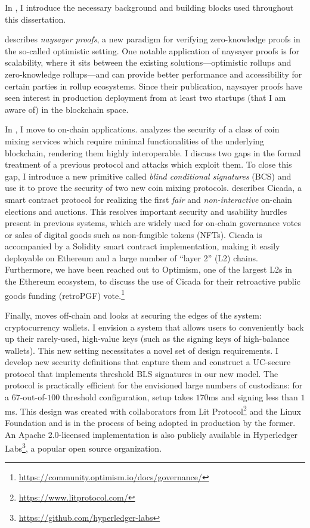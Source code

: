 In , I introduce the necessary background and building blocks used throughout this dissertation. 

 describes \emph{naysayer proofs}, a new paradigm for verifying zero-knowledge proofs in the so-called optimistic setting. One notable application of naysayer proofs is for scalability, where it sits between the existing solutions---optimistic rollups and zero-knowledge rollups---and can provide better performance and accessibility for certain parties in rollup ecosystems. Since their publication, naysayer proofs have seen interest in production deployment from at least two startups (that I am aware of) in the blockchain space. %

In , I move to on-chain applications. 
 analyzes the security of a class of coin mixing services which require minimal functionalities of the underlying blockchain, rendering them highly interoperable. I discuss two gaps in the formal treatment of a previous protocol and attacks which exploit them. To close this gap, I introduce a new primitive called \emph{blind conditional signatures} (BCS) and use it to prove the security of two new coin mixing protocols.
 describes Cicada, a smart contract protocol for realizing the first \emph{fair} and \emph{non-interactive} on-chain elections and auctions. This resolves important security and usability hurdles present in previous systems, which are widely used for on-chain governance votes or sales of digital goods such as non-fungible tokens (NFTs). Cicada is accompanied by a Solidity smart contract implementation, making it easily deployable on Ethereum and a large number of ``layer 2'' (L2) chains. Furthermore, we have been reached out to Optimism, one of the largest L2s in the Ethereum ecosystem, to discuss the use of Cicada for their retroactive public goods funding (retroPGF) vote.\footnote{\url{https://community.optimism.io/docs/governance/}}

Finally,  moves off-chain and looks at securing the edges of the system: cryptocurrency wallets. I envision a system that allows users to conveniently back up their rarely-used, high-value keys (such as the signing keys of high-balance wallets). This new setting necessitates a novel set of design requirements. I develop new security definitions that capture them and construct a UC-secure protocol that implements threshold BLS signatures in our new model. The protocol is practically efficient for the envisioned large numbers of custodians: for a $67$-out-of-$100$ threshold configuration, setup takes $170$ms and signing less than $1$ms.
This design was created with collaborators from Lit Protocol\footnote{\url{https://www.litprotocol.com/}} and the Linux Foundation and is in the process of being adopted in production by the former. An Apache 2.0-licensed implementation is also publicly available in Hyperledger Labs\footnote{\url{https://github.com/hyperledger-labs}}, a popular open source organization.

